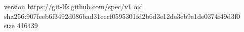 version https://git-lfs.github.com/spec/v1
oid sha256:907feeb6f3492d086bad31eccf0595301fd2b6d3e12de3eb9e1de0374f49d3f0
size 416439
